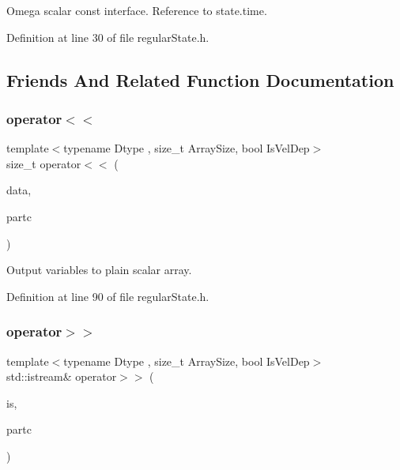 Omega scalar const interface. Reference to state.\+time. 



Definition at line 30 of file regular\+State.\+h.



\subsection{Friends And Related Function Documentation}
\mbox{\label{class_regu_particles_a9c2e33942d0a3b99667c5535bad8f7e9}} 
\subsubsection{\texorpdfstring{operator$<$$<$}{operator<<}}
{\footnotesize\ttfamily template$<$typename Dtype , size\+\_\+t Array\+Size, bool Is\+Vel\+Dep$>$ \\
size\+\_\+t operator$<$$<$ (\begin{DoxyParamCaption}\item[{\mbox{\hyperlink{class_vel_indep_particles_a6bba8ac3f941a144214037a27ccaa119}{Dyn\+Scalar\+Array}} \&}]{data,  }\item[{const \mbox{\hyperlink{class_regu_particles}{Regu\+Particles}}$<$ Dtype, Array\+Size, Is\+Vel\+Dep $>$ \&}]{partc }\end{DoxyParamCaption})\hspace{0.3cm}{\ttfamily [friend]}}



Output variables to plain scalar array. 



Definition at line 90 of file regular\+State.\+h.

\mbox{\label{class_regu_particles_a9a189bff31e696428cec5810b545f050}} 
\subsubsection{\texorpdfstring{operator$>$$>$}{operator>>}\hspace{0.1cm}{\footnotesize\ttfamily [1/2]}}
{\footnotesize\ttfamily template$<$typename Dtype , size\+\_\+t Array\+Size, bool Is\+Vel\+Dep$>$ \\
std\+::istream\& operator$>$$>$ (\begin{DoxyParamCaption}\item[{std\+::istream \&}]{is,  }\item[{\mbox{\hyperlink{class_regu_particles}{Regu\+Particles}}$<$ Dtype, Array\+Size, Is\+Vel\+Dep $>$ \&}]{partc }\end{DoxyParamCaption})\hspace{0.3cm}{\ttfamily [friend]}}



